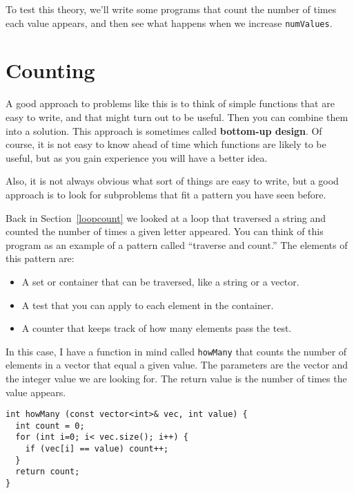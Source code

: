To test this theory, we'll write some programs that count the
number of times each value appears, and then see what happens
when we increase {\tt numValues}.

\section{Counting}
\label{counting}

A good approach to problems like this is to think of simple functions
that are easy to write, and that might turn out to be useful.  Then
you can combine them into a solution.  This approach is sometimes
called {\bf bottom-up design}.  Of course, it is not easy to
know ahead of time which functions are likely to be useful, but as you
gain experience you will have a better idea.


Also, it is not always obvious what sort of things are easy to write,
but a good approach is to look for subproblems that fit a pattern you
have seen before.


Back in Section~\ref{loopcount} we looked at a loop that traversed a
string and counted the number of times a given letter appeared.  You
can think of this program as an example of a pattern called ``traverse
and count.''  The elements of this pattern are:

\begin{itemize}

\item A set or container that can be traversed, like a string
or a vector.

\item A test that you can apply to each element in the container.

\item A counter that keeps track of how many elements pass
the test.

\end{itemize}

In this case, I have a function in mind called {\tt howMany} that
counts the number of elements in a vector that equal a given value.
The parameters are the vector and the integer value we are looking
for.  The return value is the number of times the value appears.

\begin{lstlisting}
int howMany (const vector<int>& vec, int value) {
  int count = 0;
  for (int i=0; i< vec.size(); i++) {
    if (vec[i] == value) count++;
  }
  return count;
}
\end{lstlisting}



